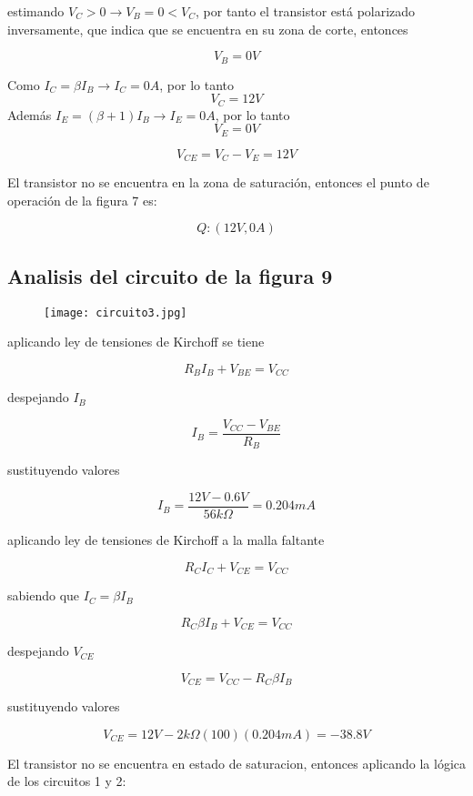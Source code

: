 \documentclass[10pt, a4paper]{article}
\begin{document}
    estimando $V_C > 0 \rightarrow V_B = 0 < V_C$, por tanto el transistor está polarizado inversamente, que indica que se encuentra en su zona de corte, entonces

    $$V_B = 0V$$

    Como $I_C = \beta I_B \longrightarrow I_C = 0A$, por lo tanto
    $$V_C = 12V$$
    Además $I_E = (\beta + 1)I_B \longrightarrow I_E = 0A$, por lo tanto
    $$V_E = 0V$$

    $$V_{CE} = V_C - V_E = 12V$$

    El transistor no se encuentra en la zona de saturación, entonces el punto de operación de la figura 7 es:

    $$Q : (12V, 0A)$$

    \subsection{Analisis del circuito de la figura 9}

    \begin{figure}[h!]
        \centering
        \texttt{[image: circuito3.jpg]}
    \end{figure}

    aplicando ley de tensiones de Kirchoff se tiene

    $$R_BI_B + V_{BE} = V_{CC}$$

    despejando $I_B$

    $$I_B = \frac{V_{CC} - V_{BE}}{R_B}$$

    sustituyendo valores

    $$I_B = \frac{12V - 0.6V}{56k\Omega} = 0.204mA$$

    aplicando ley de tensiones de Kirchoff a la malla faltante

    $$R_CI_C + V_{CE} = V_{CC}$$

    sabiendo que $I_C = \beta I_B$

    $$R_C\beta I_B + V_{CE} = V_{CC}$$

    despejando $V_{CE}$

    \begin{equation}
        V_{CE} = V_{CC} - R_C\beta I_B
    \end{equation}

    sustituyendo valores

    $$V_{CE} = 12V - 2k\Omega (100) (0.204mA) = -38.8V$$

    El transistor no se encuentra en estado de saturacion, entonces aplicando la lógica de los circuitos 1 y 2:
\end{document}
